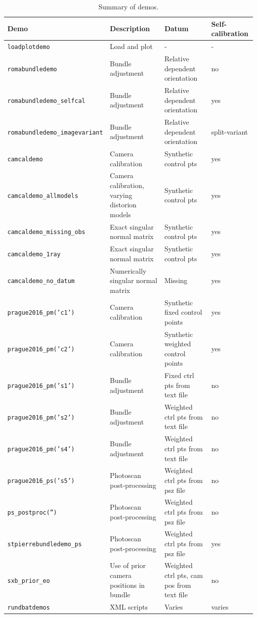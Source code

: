\documentclass{article}
\begin{document}
\begin{table}
\caption{\label{tab:demos}
Summary of demos.}
\centering
\begin{tabular}{llll}
Demo & Description & Datum & Self-calibration\\
\hline
\texttt{loadplotdemo} & Load and plot & - & -\\
\hline
\texttt{romabundledemo} & Bundle adjustment & Relative dependent orientation & no\\
\texttt{romabundledemo\_selfcal} & Bundle adjustment & Relative dependent orientation & yes\\
\texttt{romabundledemo\_imagevariant} & Bundle adjustment & Relative dependent orientation & split-variant\\
\hline
\texttt{camcaldemo} & Camera calibration & Synthetic control pts & yes\\
\texttt{camcaldemo\_allmodels} & Camera calibration, varying distorion models & Synthetic control pts & yes\\
\texttt{camcaldemo\_missing\_obs} & Exact singular normal matrix & Synthetic control pts & yes\\
\texttt{camcaldemo\_1ray} & Exact singular normal matrix & Synthetic control pts & yes\\
\texttt{camcaldemo\_no\_datum} & Numerically singular normal matrix & Missing & yes\\
\hline
\texttt{prague2016\_pm('c1')} & Camera calibration & Synthetic fixed control points & yes\\
\texttt{prague2016\_pm('c2')} & Camera calibration & Synthetic weighted control points & yes\\
\texttt{prague2016\_pm('s1')} & Bundle adjustment & Fixed ctrl pts from text file & no\\
\texttt{prague2016\_pm('s2')} & Bundle adjustment & Weighted ctrl pts from text file & no\\
\texttt{prague2016\_pm('s4')} & Bundle adjustment & Weighted ctrl pts from text file & no\\
\hline
\texttt{prague2016\_ps('s5')} & Photoscan post-processing & Weighted ctrl pts from psz file & no\\
\hline
\texttt{ps\_postproc('')} & Photoscan post-processing & Weighted ctrl pts from psz file & no\\
\hline
\texttt{stpierrebundledemo\_ps} & Photoscan post-processing & Weighted ctrl pts from psz file & yes\\
\hline
\texttt{sxb\_prior\_eo} & Use of prior camera positions in bundle & Weighted ctrl pts, cam pos from text file & no\\
\hline
\texttt{rundbatdemos} & XML scripts & Varies & varies\\
\end{tabular}
\end{table}
\end{document}
